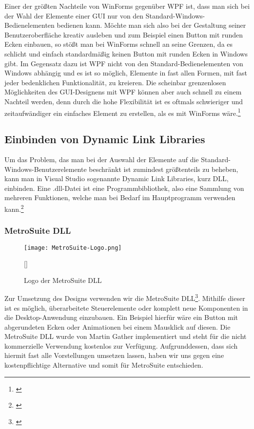Einer der größten Nachteile von WinForms gegenüber WPF ist, dass man sich bei der Wahl der Elemente einer GUI nur von den Standard-Windows-Bedienelementen bedienen kann. Möchte man sich also bei der Gestaltung seiner Benutzeroberfläche kreativ ausleben und zum Beispiel einen Button mit runden Ecken einbauen, so stößt man bei WinForms schnell an seine Grenzen, da es schlicht und einfach standardmäßig keinen Button mit runden Ecken in Windows gibt. Im Gegensatz dazu ist WPF nicht von den Standard-Bedienelementen von Windows abhängig und es ist so möglich, Elemente in fast allen Formen, mit fast jeder bedenklichen Funktionalität, zu kreieren. Die scheinbar grenzenlosen Möglichkeiten des GUI-Designens mit WPF können aber auch schnell zu einem Nachteil werden, denn durch die hohe Flexibilität ist es oftmals schwieriger und zeitaufwändiger ein einfaches Element zu erstellen, als es mit WinForms wäre.\footnote[3]{\cite[Vgl.][]{Vergleich}}

\subsection{Einbinden von Dynamic Link Libraries}

 Um das Problem, das man bei der Auswahl der Elemente auf die Standard-Windows-Benutzerelemente beschränkt ist zumindest größtenteils zu beheben, kann man in Visual Studio sogenannte Dynamic Link Libraries, kurz DLL, einbinden. Eine .dll-Datei ist eine Programmbibliothek, also eine Sammlung von mehreren Funktionen, welche man bei Bedarf im Hauptprogramm verwenden kann.\footnote[1]{\cite[Vgl.][]{DLL}}

\subsubsection{MetroSuite DLL}

\begin{figure}[H]
    \centering
    \texttt{[image: MetroSuite-Logo.png]}
    \caption[Logo der MetroSuite DLL]{Logo der MetroSuite DLL}[\cite{MetroSuite1}]
\end{figure}
\noindent 
Zur Umsetzung des Designs verwenden wir die MetroSuite DLL\footnote[2]{\cite[Vgl.][]{MetroSuite2}}. Mithilfe dieser ist es möglich, überarbeitete Steuerelemente oder komplett neue Komponenten in die Desktop-Anwendung einzubauen. Ein Beispiel hierfür wäre ein Button mit abgerundeten Ecken oder Animationen bei einem Mausklick auf diesen. Die MetroSuite DLL wurde von Martin Gather implementiert und steht für die nicht kommerzielle Verwendung kostenlos zur Verfügung. Aufgrunddessen, dass sich hiermit fast alle Vorstellungen umsetzen lassen, haben wir uns gegen eine kostenpflichtige Alternative und somit für MetroSuite entschieden.

